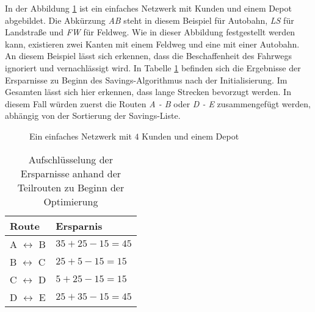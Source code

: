 \noindent
In der Abbildung \ref{fig:simpleNetwork} ist ein einfaches Netzwerk mit Kunden und einem Depot abgebildet. 
Die Abkürzung \textit{AB} steht in diesem Beispiel für Autobahn, \textit{LS} für Landstraße und \textit{FW} für Feldweg. 
Wie in dieser Abbildung festgestellt werden kann, existieren zwei Kanten mit einem Feldweg und eine mit einer Autobahn. 
An diesem Beispiel lässt sich erkennen, dass die Beschaffenheit des Fahrwegs ignoriert und vernachlässigt wird. 
In Tabelle \ref{tab:distSavings} befinden sich die Ergebnisse der Ersparnisse zu Beginn des Savings-Algorithmus nach der Initialisierung. 
Im Gesamten lässt sich hier erkennen, dass lange Strecken bevorzugt werden. 
In diesem Fall würden zuerst die Routen \textit{A - B} oder \textit{D - E} zusammengefügt werden, abhängig von der Sortierung der Savings-Liste. 
\begin{figure}
\centering
{}

	\caption{Ein einfaches Netzwerk mit $4$ Kunden und einem Depot}
	\label{fig:simpleNetwork}
\end{figure}
\begin{table}[htb]%
\centering
\begin{tabular}{p{3cm}|p{4cm}}
Route & Ersparnis \\ 
\hline 
A $\leftrightarrow$ B & $35 + 25 - 15 = 45$ \\ 
B $\leftrightarrow$ C & $25 + 5 - 15 = 15$ \\ 
C $\leftrightarrow$ D & $5 + 25 - 15 = 15$ \\ 
D $\leftrightarrow$ E & $25 + 35 - 15 = 45$ \\ 
\end{tabular} 
\caption{Aufschlüsselung der Ersparnisse anhand der Teilrouten zu Beginn der Optimierung}
\label{tab:distSavings}
\end{table}

